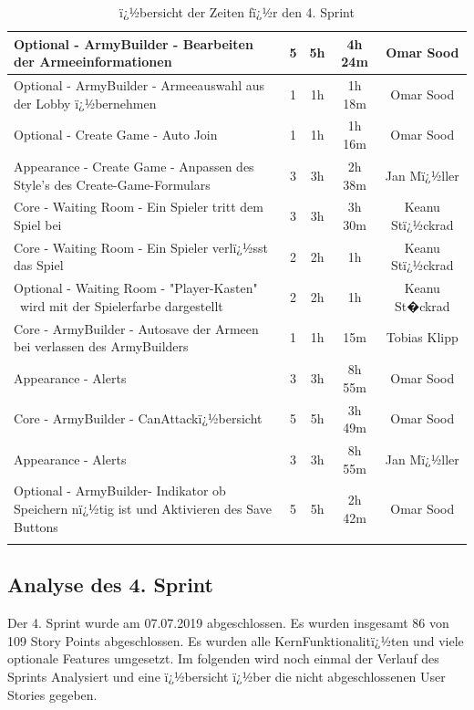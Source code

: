 \documentclass[12pt, titlepage]{scrartcl}
\begin{document}
\begin{center}
\begin{longtable}{p{6cm} c c c c }
					Optional - ArmyBuilder - Bearbeiten der Armeeinformationen & 5 & 5h & 4h 24m & Omar Sood\\ \hline
					
					Optional - ArmyBuilder - Armeeauswahl aus der Lobby ï¿½bernehmen & 1 & 1h & 1h 18m & Omar Sood\\ \hline
					
					Optional - Create Game - Auto Join & 1 & 1h & 1h 16m & Omar Sood\\ \hline
					
					Appearance - Create Game - Anpassen des Style's des Create-Game-Formulars & 3 & 3h & 2h 38m & Jan Mï¿½ller\\ \hline
					
					Core - Waiting Room - Ein Spieler tritt dem Spiel bei & 3 & 3h & 3h 30m & Keanu Stï¿½ckrad\\ \hline
					
					Core - Waiting Room - Ein Spieler verlï¿½sst das Spiel & 2 & 2h & 1h & Keanu Stï¿½ckrad \\ \hline
					
					Optional - Waiting Room - "Player-Kasten" \ wird mit der Spielerfarbe dargestellt & 2 & 2h & 1h & Keanu St�ckrad\\ \hline
					
					Core - ArmyBuilder - Autosave der Armeen bei verlassen des ArmyBuilders & 1 & 1h & 15m & Tobias Klipp\\
					
					Appearance - Alerts & 3 & 3h & 8h 55m & Omar Sood \\ \hline
					
					Core - ArmyBuilder - \glqq CanAttack\grqq ï¿½bersicht & 5 & 5h & 3h 49m & Omar Sood \\ \hline
					
					Appearance - Alerts & 3 & 3h & 8h 55m & Jan Mï¿½ller \\ \hline
					
					Optional - ArmyBuilder- Indikator ob Speichern nï¿½tig ist und Aktivieren des Save Buttons & 5 & 5h & 2h 42m & Omar Sood\\
					\caption{ï¿½bersicht der Zeiten fï¿½r den 4. Sprint} \\
				\end{longtable}
			\end{center}
			
		\subsection{Analyse des 4. Sprint}
			Der 4. Sprint wurde am 07.07.2019 abgeschlossen. Es wurden insgesamt 86 von 109 Story Points abgeschlossen. Es wurden alle KernFunktionalitï¿½ten und viele optionale Features umgesetzt. Im folgenden wird noch einmal der Verlauf des Sprints Analysiert und eine ï¿½bersicht ï¿½ber die nicht abgeschlossenen User Stories gegeben. 
		
\end{document}

